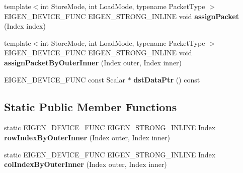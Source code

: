 \begin{DoxyCompactItemize}
\item 
\mbox{\label{class_eigen_1_1internal_1_1generic__dense__assignment__kernel_a152c4bd979ed06358343fa77edc037a7}} 
{\footnotesize template$<$int Store\+Mode, int Load\+Mode, typename Packet\+Type $>$ }\\E\+I\+G\+E\+N\+\_\+\+D\+E\+V\+I\+C\+E\+\_\+\+F\+U\+NC E\+I\+G\+E\+N\+\_\+\+S\+T\+R\+O\+N\+G\+\_\+\+I\+N\+L\+I\+NE void {\bfseries assign\+Packet} (Index index)
\item 
\mbox{\label{class_eigen_1_1internal_1_1generic__dense__assignment__kernel_a91436c094fad327d8128825e2c8a54cc}} 
{\footnotesize template$<$int Store\+Mode, int Load\+Mode, typename Packet\+Type $>$ }\\E\+I\+G\+E\+N\+\_\+\+D\+E\+V\+I\+C\+E\+\_\+\+F\+U\+NC E\+I\+G\+E\+N\+\_\+\+S\+T\+R\+O\+N\+G\+\_\+\+I\+N\+L\+I\+NE void {\bfseries assign\+Packet\+By\+Outer\+Inner} (Index outer, Index inner)
\item 
\mbox{\label{class_eigen_1_1internal_1_1generic__dense__assignment__kernel_a0f15e70d3ced7871f0c9d9b701e7f934}} 
E\+I\+G\+E\+N\+\_\+\+D\+E\+V\+I\+C\+E\+\_\+\+F\+U\+NC const Scalar $\ast$ {\bfseries dst\+Data\+Ptr} () const
\end{DoxyCompactItemize}
\subsection*{Static Public Member Functions}
\begin{DoxyCompactItemize}
\item 
\mbox{\label{class_eigen_1_1internal_1_1generic__dense__assignment__kernel_acd610e29a8a60fe5399ccc0d944517a0}} 
static E\+I\+G\+E\+N\+\_\+\+D\+E\+V\+I\+C\+E\+\_\+\+F\+U\+NC E\+I\+G\+E\+N\+\_\+\+S\+T\+R\+O\+N\+G\+\_\+\+I\+N\+L\+I\+NE Index {\bfseries row\+Index\+By\+Outer\+Inner} (Index outer, Index inner)
\item 
\mbox{\label{class_eigen_1_1internal_1_1generic__dense__assignment__kernel_af6260148d2eac69af23dcd24cca3adb0}} 
static E\+I\+G\+E\+N\+\_\+\+D\+E\+V\+I\+C\+E\+\_\+\+F\+U\+NC E\+I\+G\+E\+N\+\_\+\+S\+T\+R\+O\+N\+G\+\_\+\+I\+N\+L\+I\+NE Index {\bfseries col\+Index\+By\+Outer\+Inner} (Index outer, Index inner)
\end{DoxyCompactItemize}
